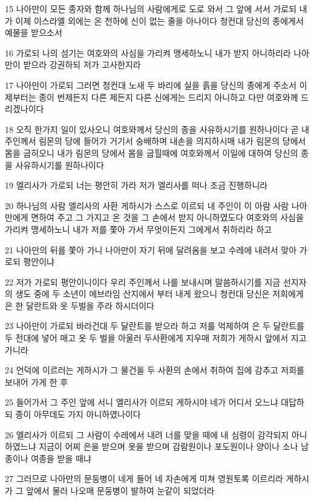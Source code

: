 \par 15 나아만이 모든 종자와 함께 하나님의 사람에게로 도로 와서 그 앞에 서서 가로되 내가 이제 이스라엘 외에는 온 천하에 신이 없는 줄을 아나이다 청컨대 당신의 종에게서 예물을 받으소서
\par 16 가로되 나의 섬기는 여호와의 사심을 가리켜 맹세하노니 내가 받지 아니하리라 나아만이 받으라 강권하되 저가 고사한지라
\par 17 나아만이 가로되 그러면 청컨대 노새 두 바리에 실을 흙을 당신의 종에게 주소서 이제부터는 종이 번제든지 다른 제든지 다른 신에게는 드리지 아니하고 다만 여호와께 드리겠나이다
\par 18 오직 한가지 일이 있사오니 여호와께서 당신의 종을 사유하시기를 원하나이다 곧 내 주인께서 림몬의 당에 들어가 거기서 숭배하며 내손을 의지하시매 내가 림몬의 당에서 몸을 굽히오니 내가 림몬의 당에서 몸을 굽힐때에 여호와께서 이일에 대하여 당신의 종을 사유하시기를 원하나이다
\par 19 엘리사가 가로되 너는 평안히 가라 저가 엘리사를 떠나 조금 진행하니라
\par 20 하나님의 사람 엘리사의 사환 게하시가 스스로 이르되 내 주인이 이 아람 사람 나아만에게 면하여 주고 그 가지고 온 것을 그 손에서 받지 아니하였도다 여호와의 사심을 가리켜 맹세하노니 내가 저를 쫓아 가서 무엇이든지 그에게서 취하리라 하고
\par 21 나아만의 뒤를 쫓아 가니 나아만이 자기 뒤에 달려옴을 보고 수레에 내려서 맞아 가로되 평안이냐
\par 22 저가 가로되 평안이니이다 우리 주인께서 나를 보내시며 말씀하시기를 지금 선지자의 생도 중에 두 소년이 에브라임 산지에서 부터 내게 왔으니 청컨대 당신은 저희에게 은 한 달란트와 옷 두벌을 주라 하시더이다
\par 23 나아만이 가로되 바라건대 두 달란트를 받으라 하고 저를 억제하여 은 두 달란트를 두 전대에 넣어 매고 옷 두 벌을 아울러 두사환에게 지우매 저희가 게하시 앞에서 지고 가니라
\par 24 언덕에 이르러는 게하시가 그 물건을 두 사환의 손에서 취하여 집에 감추고 저희를 보내어 가게 한 후
\par 25 들어가서 그 주인 앞에 서니 엘리사가 이르되 게하시야 네가 어디서 오느냐 대답하되 종이 아무데도 가지 아니하였나이다
\par 26 엘리사가 이르되 그 사람이 수레에서 내려 너를 맞을 때에 내 심령이 감각되지 아니하였느냐 지금이 어찌 은을 받으며 옷을 받으며 감람원이나 포도원이나 양이나 소나 남종이나 여종을 받을 때냐
\par 27 그러므로 나아만의 문둥병이 네게 들어 네 자손에게 미쳐 영원토록 이르리라 게하시가 그 앞에서 물러 나오매 문둥병이 발하여 눈같이 되었더라

